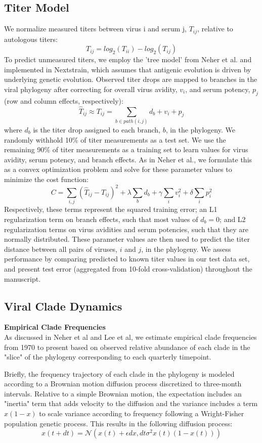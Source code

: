 \documentclass[11pt,oneside,letterpaper]{article}
\begin{document}
\subsection*{Titer Model}
We normalize measured titers between virus i and serum j, $T_{ij}$, relative to autologous titers: $$T_{ij} = log_2(T_{ii}) - log_2(T_{ij})$$
To predict unmeasured titers, we employ the 'tree model' from Neher et al. and implemented in Nextstrain, which assumes that antigenic evolution is driven by underlying genetic evolution.
Observed titer drops are mapped to branches in the viral phylogeny after correcting for overall virus avidity, $v_i$, and serum potency, $p_j$ (row and column effects, respectively):
$$\hat{T}_{ij} \approx T_{ij} = \sum_{b \in path(i,j)} d_b + v_i + p_j$$
where $d_b$ is the titer drop assigned to each branch, $b$, in the phylogeny.
We randomly withhold 10\% of titer measurements as a test set.
We use the remaining 90\% of titer measurements as a training set to learn values for virus avidity, serum potency, and branch effects.
As in Neher et al., we formulate this as a convex optimization problem and solve for these parameter values to minimize the cost function:
$$C = \sum_{i,j} (\hat{T}_{ij} - T_{ij})^2 + \lambda \sum_{b} d_b + \gamma \sum_{i} v_i^2 + \delta \sum_{i} p_i^2$$
Respectively, these terms represent the squared training error; an L1 regularization term on branch effects, such that most values of $d_b = 0$; and L2 regularization terms on virus avidities and serum potencies, such that they are normally distributed.
These parameter values are then used to predict the titer distance between all pairs of viruses, $i$ and $j$, in the phylogeny.
We assess performance by comparing predicted to known titer values in our test data set, and present test error (aggregated from 10-fold cross-validation) throughout the manuscript.

\subsection*{Viral Clade Dynamics}

\textbf{Empirical Clade Frequencies}\\
As discussed in Neher et al and Lee et al, we estimate empirical clade frequencies from 1970 to present based on observed relative abundance of each clade in the "slice" of the phylogeny corresponding to each quarterly timepoint.

Briefly, the frequency trajectory of each clade in the phylogeny is modeled according to a Brownian motion diffusion process discretized to three-month intervals.
Relative to a simple Brownian motion, the expectation includes an "inertia" term that adds velocity to the diffusion and the variance includes a term $x(1-x)$ to scale variance according to frequency following a Wright-Fisher population genetic process.
This results in the following diffusion process:
$$x(t+dt) = \mathcal{N}(x(t) + \epsilon dx, dt \sigma^2 x(t) (1-x(t)))$$
\end{document}
